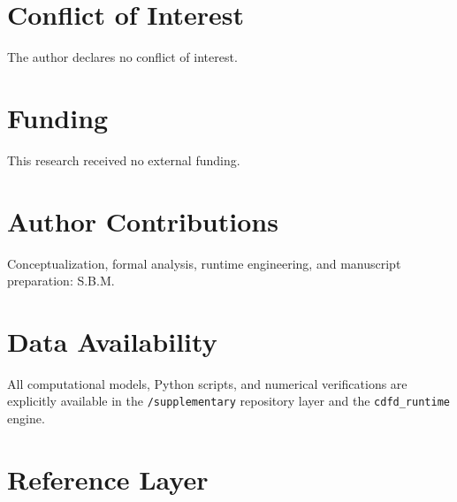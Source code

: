 \documentclass[11pt]{article}
\begin{document}
\section*{Conflict of Interest} The author declares no conflict of interest.
\section*{Funding} This research received no external funding.
\section*{Author Contributions} Conceptualization, formal analysis, runtime engineering, and manuscript preparation: S.B.M.
\section*{Data Availability} All computational models, Python scripts, and numerical verifications are explicitly available in the \texttt{/supplementary} repository layer and the \texttt{cdfd\_runtime} engine.

\section{Reference Layer}


\end{document}
